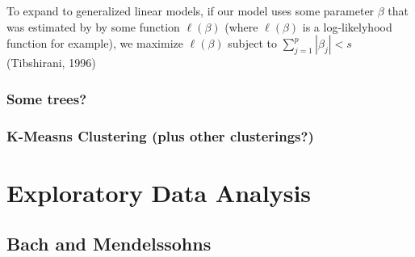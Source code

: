 \documentclass[12pt,twoside]{reedthesis}
\theoremstyle{definition}
\theoremstyle{definition}
\theoremstyle{definition}
\theoremstyle{remark}
\begin{document}
To expand to generalized linear models, if our model uses some parameter
\(\beta\) that was estimated by by some function \(\ell(\beta)\) (where
\(\ell(\beta)\) is a log-likelyhood function for example), we maximize
\(\ell(\beta)\) subject to \(\sum_{j=1}^p|\beta_j| < s\) (Tibshirani,
1996)

\subsection{Some trees?}\label{some-trees}

\subsection{K-Measns Clustering (plus other
clusterings?)}\label{k-measns-clustering-plus-other-clusterings}

\chapter{Exploratory Data Analysis}\label{exploratory-data-analysis}

\section{Bach and Mendelssohns}\label{bach-and-mendelssohns}
\end{document}

